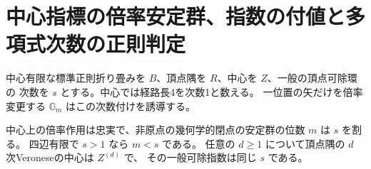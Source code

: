 \section{中心指標の倍率安定群、指数の付値と多項式次数の正則判定}
\label{sec:central-stabilizer-strata}
中心有限な標準正則折り畳みを $B$、頂点隅を $R$、中心を $Z$、一般の頂点可除環の
次数を $s$ とする。中心では経路長4を次数1と数える。
一位置の矢だけを倍率変更する $\mathbb G_m$ はこの次数付けを誘導する。

\begin{theorem}\label{thm:central-stabilizer-strata}
中心上の倍率作用は忠実で、非原点の幾何学的閉点の安定群の位数 $m$ は $s$ を割る。
四辺有限で $s>1$ なら $m<s$ である。
任意の $d\ge1$ について頂点隅の $d$ 次Veroneseの中心は $Z^{(d)}$ で、
その一般可除指数は同じ $s$ である。
\end{theorem}
